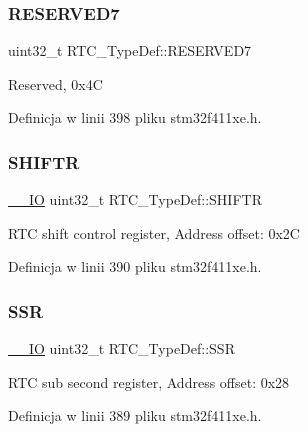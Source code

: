 \subsubsection{\texorpdfstring{R\+E\+S\+E\+R\+V\+E\+D7}{RESERVED7}}
{\footnotesize\ttfamily uint32\+\_\+t R\+T\+C\+\_\+\+Type\+Def\+::\+R\+E\+S\+E\+R\+V\+E\+D7}

Reserved, 0x4C 

Definicja w linii 398 pliku stm32f411xe.\+h.

\mbox{\label{struct_r_t_c___type_def_a6082856c9191f5003b6163c0d3afcaff}} 
\subsubsection{\texorpdfstring{S\+H\+I\+F\+TR}{SHIFTR}}
{\footnotesize\ttfamily \hyperlink{core__sc300_8h_aec43007d9998a0a0e01faede4133d6be}{\+\_\+\+\_\+\+IO} uint32\+\_\+t R\+T\+C\+\_\+\+Type\+Def\+::\+S\+H\+I\+F\+TR}

R\+TC shift control register, Address offset\+: 0x2C 

Definicja w linii 390 pliku stm32f411xe.\+h.

\mbox{\label{struct_r_t_c___type_def_aefbd38be87117d1fced289bf9c534414}} 
\subsubsection{\texorpdfstring{S\+SR}{SSR}}
{\footnotesize\ttfamily \hyperlink{core__sc300_8h_aec43007d9998a0a0e01faede4133d6be}{\+\_\+\+\_\+\+IO} uint32\+\_\+t R\+T\+C\+\_\+\+Type\+Def\+::\+S\+SR}

R\+TC sub second register, Address offset\+: 0x28 

Definicja w linii 389 pliku stm32f411xe.\+h.

\mbox{\label{struct_r_t_c___type_def_a498ecce9715c916dd09134fddd0072c0}} 
